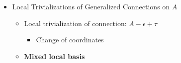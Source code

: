 {\begin{itemize}
\begin{itemize}
        Still valid interpretation: gauge potential, given of gauge fields that fix ``local'' gauge invariance.
        
        \item Ordinary connection from background connection
            
        \item Curvature    
            
            \begin{itemize}
                
            \item Nabla version
            
            \item Form version
            
            \item If ordinary connection, we can recover usual notion of curvature (of ppal bundle connection): nabla version
            
            \item Bianchi? Only for ordinary? ``HOmogeneous field equation''
                
            \end{itemize}
            
        \item Algebraic curvature of $\tau$
        
        \item Decomposition given background connection
        
        \end{itemize}
        
    \item Local Trivializations of Generalized Connections on $A$
    
        \begin{itemize}
            
        \item Local trivialization of connection: $A - \epsilon + \tau$
        
            \begin{itemize}
                
            \item Change of coordinates
                
            \end{itemize}
        
        \item \textbf{Mixed local basis}
        

\end{itemize}
\end{itemize}}

